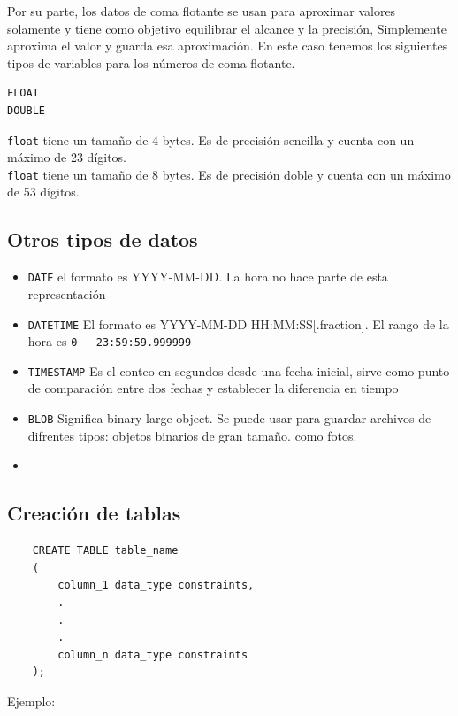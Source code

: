 Por su parte, los datos de coma flotante se usan para aproximar valores solamente y tiene como objetivo equilibrar el alcance y la precisión, Simplemente aproxima el valor y guarda esa aproximación. En este caso tenemos los siguientes tipos de variables para los números de coma flotante.

\begin{verbatim}
FLOAT
DOUBLE
\end{verbatim}

\texttt{float} tiene un tamaño de 4 bytes. Es de precisión sencilla y cuenta con un máximo de 23 dígitos.  \\
\texttt{float} tiene un tamaño de 8 bytes. Es de precisión doble y cuenta con un máximo de 53 dígitos.  \\

\subsection{Otros tipos de datos}

\begin{itemize}
    \item \texttt{DATE} el formato es YYYY-MM-DD. La hora no hace parte de esta representación
    \item \texttt{DATETIME} El formato es YYYY-MM-DD HH:MM:SS[.fraction]. El rango de la hora es \texttt{0 - 23:59:59.999999}
    \item \texttt{TIMESTAMP} Es el conteo en segundos desde una fecha inicial, sirve como punto de comparación entre dos fechas y establecer la diferencia en tiempo
    \item \texttt{BLOB} Significa binary large object. Se puede usar para guardar archivos de difrentes tipos: objetos binarios de gran tamaño. como fotos. 
    \item \texttt{}
\end{itemize}


 
\subsection{Creación de tablas}
 
 
 \begin{verbatim}
    CREATE TABLE table_name
    (
        column_1 data_type constraints,
        .
        .
        .
        column_n data_type constraints
    );
 \end{verbatim}
 
 
 Ejemplo:
 
